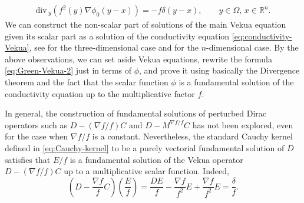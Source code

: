 \documentclass[12pt]{article}
\def\div{\mbox{div}\,}
\begin{document}
\begin{align*}\label{eq:fundamental-conductivity}
\div_y\left(f^2(y) \nabla \phi_0(y-x)\right)=-f\delta(y-x), \qquad  y\in \Omega, \, x\in \mathbb{R}^n.
\end{align*}
We can construct the non-scalar part of solutions of the main Vekua equation given its scalar part as a solution of the conductivity equation \eqref{eq:conductivity-Vekua}, see \cite{DelPor2018} for the three-dimensional case and \cite{Delgado-Moreira} for the $n$-dimensional case.
By the above observations, we can set aside Vekua equations, rewrite the formula \eqref{eq:Green-Vekua-2} just in terms of $\phi$, and prove it using basically the Divergence theorem and the fact that the scalar function $\phi$ is a fundamental solution of the conductivity equation up to the multiplicative factor $f$.

In general, the construction of fundamental solutions of perturbed Dirac operators such as $D-(\nabla f/f)C$ and $D-M^{\nabla f/f}C$ has not been explored, even for the case when $\nabla f/f$ is a constant. Nevertheless, the standard Cauchy kernel defined in \eqref{eq:Cauchy-kernel} to be a purely vectorial fundamental solution of $D$ satisfies that $E/f$ is a fundamental solution of the Vekua operator $D-(\nabla f/f)C$ up to a multiplicative scalar function. Indeed,
\begin{equation}\label{eq:fundamental-Cauchy}
  \left(D-\dfrac{\nabla f}{f} C\right)\left(\dfrac{E}{f}\right)=\dfrac{DE}{f}-\dfrac{ \nabla f}{f^2}E+\dfrac{\nabla f}{f^2}E=\dfrac{\delta}{f}.
\end{equation}
\end{document}
